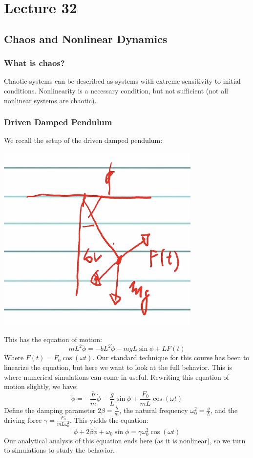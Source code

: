 \section{Lecture 32}
\subsection{Chaos and Nonlinear Dynamics}
\subsubsection{What is chaos?}
Chaotic systems can be described as systems with extreme sensitivity to initial conditions. Nonlinearity is a necessary condition, but not sufficient (not all nonlinear systems are chaotic). 

\subsubsection{Driven Damped Pendulum}
We recall the setup of the driven damped pendulum:
\begin{center}
    \includegraphics[scale=0.7]{Lecture-32/l32-img1.png}
\end{center}
This has the equation of motion:
\[mL^2\ddot{\phi} = -bL^2\dot{\phi} - mgL\sin\phi + LF(t)\]
Where $F(t) = F_0\cos(\omega t)$. Our standard technique for this course has been to linearize the equation, but here we want to look at the full behavior. This is where numerical simulations can come in useful. Rewriting this equation of motion slightly, we have:
\[\ddot{\phi} = -\frac{b}{m}\dot{\phi} - \frac{g}{L}\sin\phi + \frac{F_0}{mL}\cos(\omega t)\]
Define the damping parameter $2\beta = \frac{b}{m}$, the natural frequency $\omega_0^2 = \frac{g}{L}$, and the driving force $\gamma = \frac{F_0}{mL\omega_0^2}$. This yields the equation:
\[\ddot{\phi} + 2\beta\dot{\phi} + \omega_0\sin\phi = \gamma \omega_0^2\cos(\omega t)\]
Our analytical analysis of this equation ends here (as it is nonlinear), so we turn to simulations to study the behavior. 

